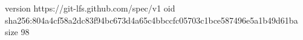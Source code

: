 version https://git-lfs.github.com/spec/v1
oid sha256:804a4cf58a2dc83f94bc673d4a65c4bbccfc05703c1bce587496e5a1b49d61ba
size 98
